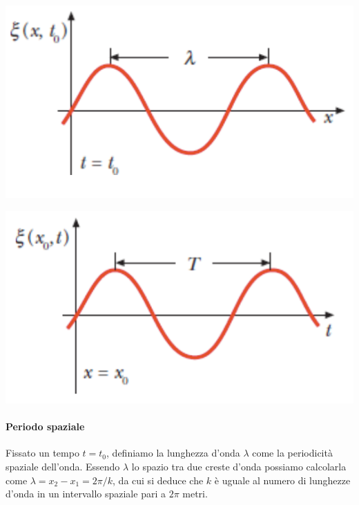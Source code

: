 \documentclass[x11names]{report}
\begin{document}
	\vspace{0.6cm}
	\begin{minipage}{0.4\textwidth}
		\begin{center}
			\includegraphics[scale=0.4]{imgs/periodo1.png}
		\end{center}
	\end{minipage}
	\begin{minipage}{0.60\textwidth}
		\begin{center}
			\includegraphics[scale=0.4]{imgs/periodo2.png}
		\end{center}
	\end{minipage}
	\vspace{0.2cm}
	
	
	\noindent
	\paragraph{Periodo spaziale} Fissato un tempo \(t=t_0\), definiamo la lunghezza d'onda \(\lambda\) come la periodicità spaziale dell'onda. Essendo \(\lambda\) lo spazio tra due creste d'onda possiamo calcolarla come \(\lambda = x_2 - x_1 = 2\pi / k\), da cui si deduce che \(k\) è uguale al numero di lunghezze d'onda in un intervallo spaziale pari a \(2\pi\) metri.
	
\end{document}
